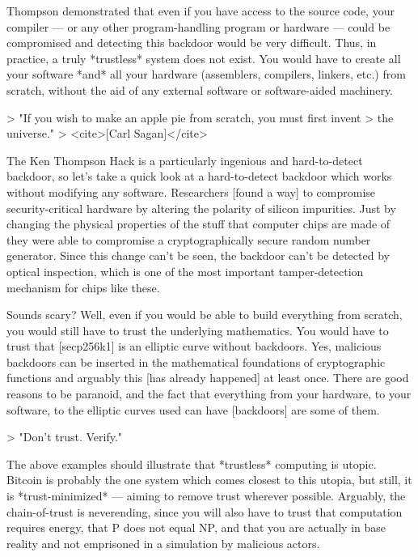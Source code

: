 {%

Thompson demonstrated that even if you have access to the source code,
your compiler --- or any other program-handling program or
hardware --- could be compromised and detecting this backdoor would be
very difficult. Thus, in practice, a truly *trustless* system does not
exist. You would have to create all your software *and* all your
hardware (assemblers, compilers, linkers, etc.) from scratch, without
the aid of any external software or software-aided machinery.

> "If you wish to make an apple pie from scratch, you must first invent
> the universe."
> <cite>[Carl Sagan]</cite>

The Ken Thompson Hack is a particularly ingenious and hard-to-detect
backdoor, so let's take a quick look at a hard-to-detect backdoor which
works without modifying any software. Researchers [found a way] to
compromise security-critical hardware by altering the polarity of
silicon impurities. Just by changing the physical properties of the
stuff that computer chips are made of they were able to compromise a
cryptographically secure random number generator. Since this change
can't be seen, the backdoor can't be detected by optical inspection,
which is one of the most important tamper-detection mechanism for chips
like these.

{%

Sounds scary? Well, even if you would be able to build everything from
scratch, you would still have to trust the underlying mathematics. You
would have to trust that [secp256k1] is an elliptic curve without
backdoors. Yes, malicious backdoors can be inserted in the mathematical
foundations of cryptographic functions and arguably this [has already
happened] at least once. There are good reasons to be paranoid, and the
fact that everything from your hardware, to your software, to the
elliptic curves used can have [backdoors] are some of them.

> "Don't trust. Verify."

The above examples should illustrate that *trustless* computing is
utopic. Bitcoin is probably the one system which comes closest to this
utopia, but still, it is *trust-minimized* --- aiming to remove trust
wherever possible. Arguably, the chain-of-trust is neverending, since
you will also have to trust that computation requires energy, that P
does not equal NP, and that you are actually in base reality and not
emprisoned in a simulation by malicious actors.

}}

